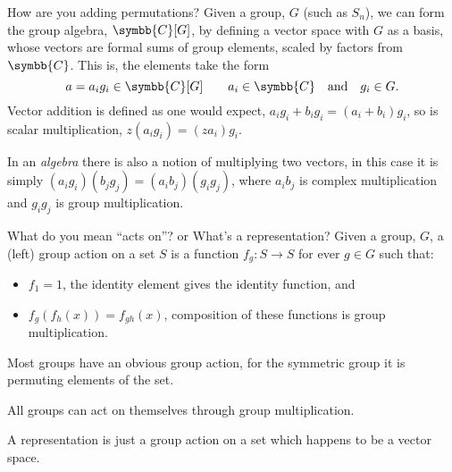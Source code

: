\documentclass{beamer}
\newcommand{\define}[1]{\alert{#1}}
\newcommand{\complex}{\symbb{C}}
\begin{document}
    \begin{frame}{How are you adding permutations?}
        Given a group, \(G\) (such as \(S_n\)), we can form the \define{group algebra}, \(\complex[G]\), by defining a vector space with \(G\) as a basis, whose vectors are formal sums of group elements, scaled by factors from \(\complex\).
        This is, the elements take the form
        \begin{equation*}
            a = a_i g_i \in \complex[G] \qquad a_i \in \complex \quad\text{and}\quad g_i \in G.
        \end{equation*}
        Vector addition is defined as one would expect, \(a_i g_i + b_i g_i = (a_i + b_i)g_i\), so is scalar multiplication, \(z(a_i g_i) = (za_i) g_i\).
        
        In an \emph{algebra} there is also a notion of multiplying two vectors, in this case it is simply \((a_i g_i)(b_j g_j) = (a_ib_j)(g_ig_j)\), where \(a_ib_j\) is complex multiplication and \(g_ig_j\) is group multiplication.
    \end{frame}
    
    \begin{frame}{What do you mean \enquote{acts on}? or What's a representation?}
        Given a group, \(G\), a (left) group action on a set \(S\) is a function \(f_g \colon S \to S\) for ever \(g \in G\) such that:
        \begin{itemize}
            \item \(f_1 = 1\), the identity element gives the identity function, and
            \item \(f_{g}(f_{h}(x)) = f_{gh}(x)\), composition of these functions is group multiplication.
        \end{itemize}
        
        Most groups have an obvious group action, for the symmetric group it is permuting elements of the set.
        
        All groups can act on themselves through group multiplication.
        
        A representation is just a group action on a set which happens to be a vector space.
    \end{frame}
    
\end{document}
